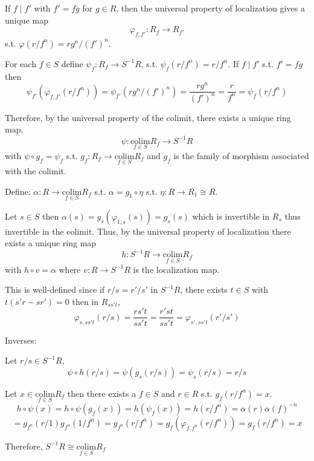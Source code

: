 \documentclass[12pt, letterpaper]{article}
\begin{document}
\begin{subproblem}{}
    
\end{subproblem}
\begin{problemproof}
    If $f \mid f'$ with $f'=fg$ for $g \in R$, then the universal property of localization gives a unique map
    \[\varphi_{f,f'}: R_f \to R_{f'}\]
    s.t. $\varphi(r/f^n)=rg^n/(f')^n$.

    For each $f \in S$ define $\psi_f : R_f \to S^{-1}R$, s.t. $\psi_f(r/f^n)=r/f^n$. If $f \mid f'$ s.t. $f'=fg$ then
    \[\psi_{f'}(\varphi_{f,f'}(r/f^n))=\psi_{f'}(rg^n/(f')^n)=\frac{rg^n}{(f')^n}=\frac{r}{f^n}=\psi_f(r/f^n)\]

    Therefore, by the universal property of the colimit, there exists a unique ring map,
    \[\psi: \underset{f \in S}{\mathrm{colim}}R_f \to S^{-1}R\]
    with $\psi \circ g_f = \psi_f$ s.t. $g_f: R_f \to \underset{f \in S}{\mathrm{colim}}R_f$ and $g_f$ is the family of morphism associated with the colimit.

    Define: $\alpha: R \to \underset{f \in S}{\mathrm{colim}}R_f$ s.t. $\alpha = g_1 \circ \eta$ s.t. $\eta : R \to R_1 \cong R$.

    Let $s \in S$ then $\alpha(s)=g_s(\varphi_{1,s}(s))=g_s(s)$ which is invertible in $R_s$ thus invertible in the colimit. Thus, by the universal property of localization there exists a unique ring map
    \[h: S^{-1}R \to \underset{f \in S}{\mathrm{colim}}R_f\]
    with $h \circ v = \alpha$ where $v: R \to S^{-1}R$ is the localization map.

    This is well-defined since if $r/s = r'/s'$ in $S^{-1}R$, there exists $t \in S$ with $t(s'r-sr')=0$ then in $R_{ss't}$,
    \[\varphi_{s,ss't}(r/s)=\frac{rs't}{ss't}=\frac{r'st}{ss't}=\varphi_{s',ss't}(r'/s')\]

    Inverses:

    Let $r/s \in S^{-1}R$,
    \[\psi \circ h(r/s)=\psi(g_s(r/s))=\psi_s(r/s)=r/s\]

    Let $x \in \underset{f \in S}{\mathrm{colim}}R_f$ then there exists a $f \in S$ and $r \in R$ s.t. $g_f(r/f^n)=x$.
    \[h \circ \psi(x)=h \circ \psi(g_f(x))=h(\psi_f(x))=h(r/f^n)=\alpha(r)\alpha(f)^{-n}\]
    \[=g_{f^n}(r/1)g_{f^n}(1/f^n)=g_{f^n}(r/f^n)=g_f(\varphi_{f,f^n}(r/f^n))=g_f(r/f^n)=x\]

    Therefore, $S^{-1}R \cong \underset{f \in S}{\mathrm{colim}}R_f$
\end{problemproof}
\end{document}
